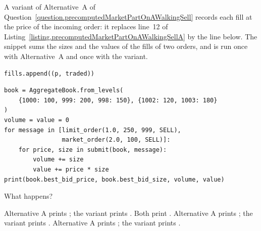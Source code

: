\begin{question}
\label{question.fillsPricedAtTheIncomingOrder}
A variant of Alternative~A of Question~\ref{question.precomputedMarketPartOnAWalkingSell}
records each fill at the price of the incoming order:
it replaces line~12 of Listing~\ref{listing.precomputedMarketPartOnAWalkingSellA}
by the line below.
The snippet sums the sizes and the values of the fills of two orders,
and is run once with Alternative~A and once with the variant.
\begin{lstlisting}[caption={Line 12 of the variant}, label=listing.fillsPricedAtTheIncomingOrderLine]
        fills.append((p, traded))
\end{lstlisting}
\begin{lstlisting}[caption={The volume and the value of two orders}, label=listing.fillsPricedAtTheIncomingOrderRun]
book = AggregateBook.from_levels(
    {1000: 100, 999: 200, 998: 150}, {1002: 120, 1003: 180}
)
volume = value = 0
for message in [limit_order(1.0, 250, 999, SELL),
                market_order(2.0, 100, SELL)]:
    for price, size in submit(book, message):
        volume += size
        value += price * size
print(book.best_bid_price, book.best_bid_size, volume, value)
\end{lstlisting}
What happens?
\begin{choices}
 \correctchoice Alternative A prints ;
  the variant prints .
 \choice Both print .
 \choice Alternative A prints ;
  the variant prints .
 \choice Alternative A prints ;
  the variant prints .
\end{choices}
\end{question}

